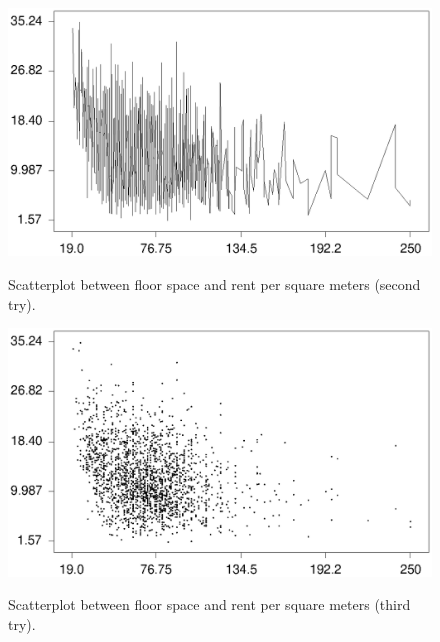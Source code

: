 \begin{figure}[ht]
\begin{center}
\includegraphics[scale=0.7]{grafiken/plotrf2.ps}
{\em\caption{ \label{plotrf2} Scatterplot between floor space and
rent per square meters (second try).}}
\end{center}
\end{figure}

\begin{figure}[ht]
\begin{center}
\includegraphics[scale=0.7]{grafiken/plotrf3.ps}
{\em\caption{ \label{plotrf3} Scatterplot between floor space and
rent per square meters (third try).}}
\end{center}
\end{figure}

